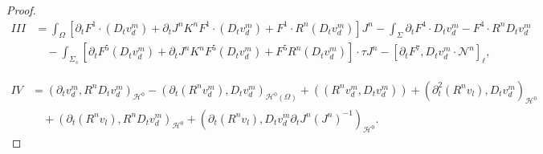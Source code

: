 \documentclass[letterpaper,reqno,10pt,twoside]{amsart}
\theoremstyle{definition}
\theoremstyle{remark}
\def\p{\partial}
\def\Om{\Omega}
\begin{document}
\begin{proof}
		\[
		\begin{aligned}
			III%
			&=\int_{\Om}\left[\p_tF^1\cdot(D_{t}v_{d}^{m})+\p_tJ^{n}K^{n}F^1\cdot(D_{t}v_{d}^{m})+F^1\cdot R^{n}(D_{t}v_{d}^{m})\right]J^{n}-\int_{\Sigma}\partial_{t}F^{4}\cdot D_{t}v_{d}^{m}-F^{4}\cdot R^{n}D_{t}v_{d}^{m}\\
			&\quad-\int_{\Sigma_s}\left[\p_tF^5 (D_{t}v_{d}^{m})+\p_tJ^{n}K^{n}F^5 (D_{t}v_{d}^{m})+F^5 R^{n}(D_{t}v_{d}^{m})\right]\cdot\tau J^{n}-[\p_tF^7,D_tv_{d}^m\cdot\mathcal{N}^{n}]_\ell,
		\end{aligned}
		\]
		
		\[
		\begin{aligned}
			IV&=(\partial_{t}v_{d}^{m},R^{n}D_{t}v_{d}^{m})_{\mathcal{H}^{0}}-(\p_{t}(R^{n}v_{d}^{m}),D_{t}v_{d}^{m})_{\mathcal{H}^{0}(\Omega)}+((R^{n}v_{d}^{m},D_{t}v_{d}^{m}))+(\p_{t}^{2}(R^{n}v_{l}),D_{t}v_{d}^{m})_{\mathcal{H}^{0}}\\
			&\quad+(\p_{t}(R^{n}v_{l}),R^{n}D_{t}v_{d}^{m})_{\mathcal{H}^{0}}+(\p_{t}(R^{n}v_{l}),D_{t}v_{d}^{m}\p_{t}J^{n}(J^{n})^{-1})_{\mathcal{H}^{0}}.
		\end{aligned}
		\]
		

\end{proof}
\end{document}

